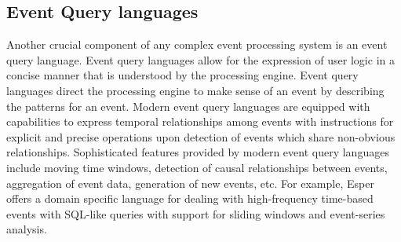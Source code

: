 \subsection{Event Query languages}
Another crucial component of any complex event processing system is an event query language. Event query languages allow for the expression of user logic in a concise manner that is understood by the processing engine. Event query languages direct the processing engine to make sense of an event by describing the patterns for an event. Modern event query languages are equipped with capabilities to express temporal relationships among events with instructions for explicit and precise operations upon detection of events which share non-obvious relationships. Sophisticated features provided by modern event query languages include moving time windows, detection of causal relationships between events, aggregation of event data, generation of new events, etc. For example, Esper \cite{Esper} offers a domain specific language for dealing with high-frequency time-based events with SQL-like queries with support for sliding windows and event-series analysis.

